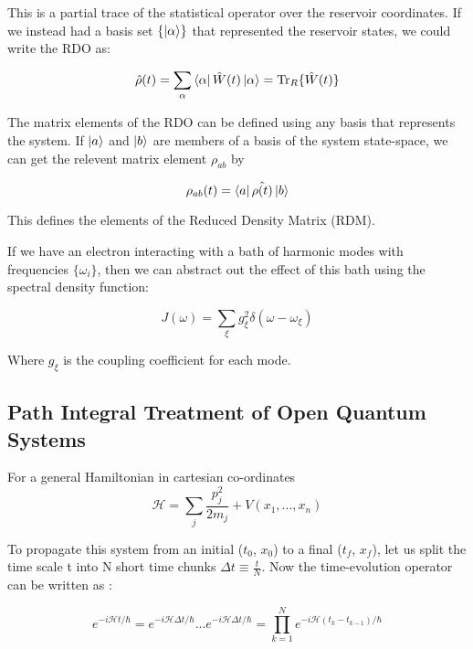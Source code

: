 This is a partial trace of the statistical operator over the reservoir coordinates. If we instead had a basis set $\{\ket{\alpha}\}$ that represented the reservoir states, we could write the RDO as:

\begin{equation}
    \hat{\rho}(t) = \sum_{\alpha} \bra{\alpha}\hat{W}(t)\ket{\alpha} = \Tr_{R}\{\hat{W}(t)\}
\end{equation}

The matrix elements of the RDO can be defined using any basis that represents the system. If $\ket{a}$ and $\ket{b}$ are members of a basis of the system state-space, we can get the relevent matrix element $\rho_{ab}$ by

\begin{equation}
    \rho_{ab}(t) = \bra{a}\hat{\rho(t)}\ket{b}
\end{equation}

This defines the elements of the Reduced Density Matrix (RDM).

If we have an electron interacting with a bath of harmonic modes with frequencies $\{\omega_i\}$, then we can abstract out the effect of this bath using the spectral density function:

\begin{equation}
    J(\omega) = \sum_{\xi} g_{\xi}^2 \delta(\omega - \omega_{\xi})
\end{equation}

Where $g_{\xi}$ is the coupling coefficient for each mode. 


\subsection{Path Integral Treatment of Open Quantum Systems}



For a general Hamiltonian in cartesian co-ordinates $$\mathcal{H} = \sum_{j} \frac{p_j^2}{2m_j} + V(x_1, ..., x_n)$$

To propagate this system from an initial ($t_0$, $x_0$) to a final ($t_f$, $x_f$), let us split the time scale t into N short time chunks $\Delta t \equiv \frac{t}{N}$. Now the time-evolution operator can be written as :

\begin{equation} \label{4.x}
    e^{-i\mathcal{H}t/\hbar} = e^{-i\mathcal{H}\Delta t/\hbar}...e^{-i\mathcal{H}\Delta t/\hbar} = \prod_{k=1}^{N} e^{-i\mathcal{H}(t_k - t_{k-1})/\hbar}
\end{equation}

